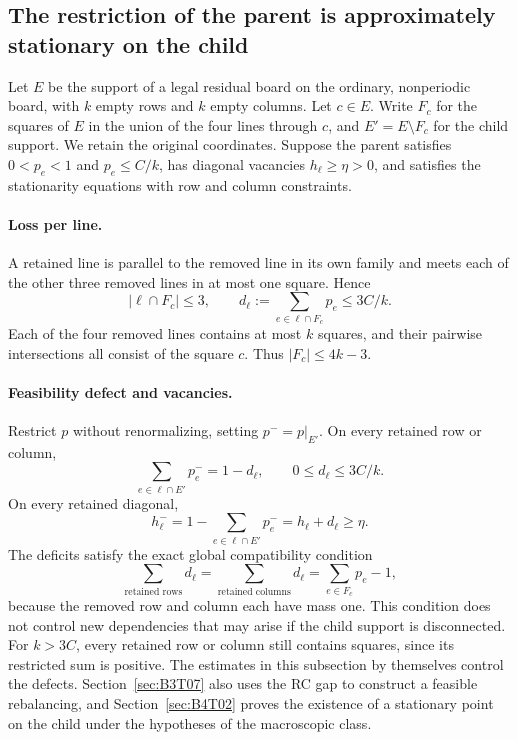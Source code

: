 \subsection{The restriction of the parent is approximately stationary on the child}\label{sec:B3T04}
Let $E$ be the support of a legal residual board on the ordinary, nonperiodic board, with $k$ empty rows and
$k$ empty columns. Let $c\in E$. Write $F_c$ for the squares of $E$ in the union of the four lines through
$c$, and $E'=E\setminus F_c$ for the child support. We retain the original coordinates. Suppose the parent
satisfies $0<p_e<1$ and $p_e\le C/k$, has diagonal vacancies $h_\ell\ge\eta>0$, and satisfies the
stationarity equations with row and column constraints.

\paragraph{Loss per line.}
A retained line is parallel to the removed line in its own family and meets each of the other three removed
lines in at most one square. Hence
\[
 |\ell\cap F_c|\le3,\qquad
 d_\ell:=\sum_{e\in\ell\cap F_c}p_e\le3C/k.
\]
Each of the four removed lines contains at most $k$ squares, and their pairwise intersections all consist of
the square $c$. Thus $|F_c|\le4k-3$.

\paragraph{Feasibility defect and vacancies.}
Restrict $p$ without renormalizing, setting $p^-=p|_{E'}$. On every retained row or column,
\[
 \sum_{e\in\ell\cap E'}p_e^-=1-d_\ell,\qquad 0\le d_\ell\le3C/k.
\]
On every retained diagonal,
\[
 h_\ell^-=1-\sum_{e\in\ell\cap E'}p_e^-=h_\ell+d_\ell\ge\eta.
\]
The deficits satisfy the exact global compatibility condition
\[
 \sum_{\text{retained rows}}d_\ell
 =\sum_{\text{retained columns}}d_\ell
 =\sum_{e\in F_c}p_e-1,
\]
because the removed row and column each have mass one. This condition does not control new dependencies that
may arise if the child support is disconnected.
For $k>3C$, every retained row or column still contains squares, since its restricted sum is positive. The
estimates in this subsection by themselves control the defects. Section~\ref{sec:B3T07} also uses the RC gap
to construct a feasible rebalancing, and Section~\ref{sec:B4T02} proves the existence of a stationary point
on the child under the hypotheses of the macroscopic class.

